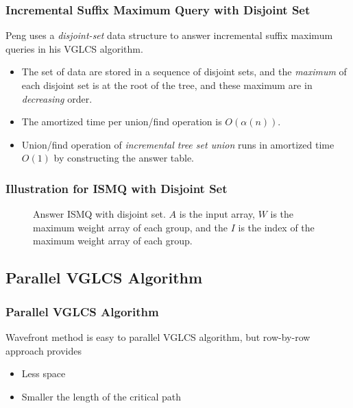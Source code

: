 \begin{frame}
    \frametitle{Incremental Suffix Maximum Query with Disjoint Set}

    Peng uses a {\em disjoint-set} data structure to answer incremental
	suffix maximum queries in his VGLCS algorithm.

	\begin{itemize}
		\setlength\itemsep{1em}
		\item 
			The set of data are stored in a sequence of disjoint sets,
			and the {\em maximum} of each disjoint set is at the root of
			the tree, and these maximum are in {\em decreasing} order.
		\item
			The amortized time per union/find operation is
			$O(\alpha(n))$.
		\item
			Union/find operation of {\em incremental tree set union}
			runs in amortized time $O(1)$ by constructing the answer
			table.
	\end{itemize}
\end{frame}

\begin{withoutheadline}
\begin{frame}
	\frametitle{Illustration for ISMQ with Disjoint Set}
	\begin{figure}[!thb]
		\centering {} 
		\caption{Answer ISMQ with disjoint set. $A$ is the input array,
			$W$ is the maximum weight array of each group, and the $I$
			is the index of the maximum weight array of each group. }
	\end{figure}
\end{frame}
\end{withoutheadline}

\subsection{Parallel VGLCS Algorithm}
\begin{frame}
    \frametitle{Parallel VGLCS Algorithm}
	Wavefront method is easy to parallel VGLCS algorithm, but row-by-row
	approach provides

    \begin{itemize}
    	\setlength\itemsep{1em}
		\item 
			Less space
		\item 
			Smaller the length of the critical path
    \end{itemize}
\end{frame}

